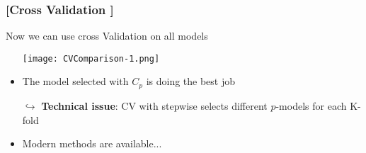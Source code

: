 \documentclass[xcolor=x11names,compress, aspectratio=169]{beamer}
\renewcommand{\(}{\begin{columns}}
\renewcommand{\)}{\end{columns}}
\newcommand{\<}[1]{\begin{column}{#1}}
\renewcommand{\>}{\end{column}}
\begin{document}
\begin{frame} %
\frametitle{\textcolor{brique}{[Cross Validation ]}}
Now we can use cross Validation on all  models
\pause
\begin{itemize}[<+->]
  \item[] \texttt{[image: CVComparison-1.png]}
  \item The model selected with $C_p$ is doing the best job
  \item[$\hookrightarrow$] \textbf{Technical issue}: CV with stepwise selects different $p$-models for each K-fold
  \item Modern methods are available...
\end{itemize}
\end{frame}


%
\end{document}
